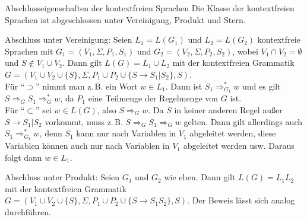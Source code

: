 \begin{Satz}{Abschlusseigenschaften der kontextfreien Sprachen}
    Die Klasse der kontextfreien Sprachen ist abgeschlossen unter
    Vereinigung, Produkt und Stern.
\end{Satz}

\begin{Beweis}
    Abschluss unter Vereinigung:
    Seien $L_1 = L(G_1)$ und $L_2 = L(G_2)$ kontextfreie Sprachen mit
    $G_1 = (V_1, \Sigma, P_1, S_1)$ und $G_2 = (V_2, \Sigma, P_2, S_2)$, wobei
    $V_1 \cap V_2 = \emptyset$ und $S \notin V_1 \cup V_2$.
    Dann gilt $L(G) = L_1 \cup L_2$ mit der kontextfreien Grammatik\\
    $G = (V_1 \cup V_2 \cup \{S\}, \Sigma,
    P_1 \cup P_2 \cup \{S \rightarrow S_1 | S_2\}, S)$.\\
    Für "`$\supset$"' nimmt man z.\,B. ein Wort $w \in L_1$.
    Dann ist $S_1 \Rightarrow_{G_1}^\ast w$ und es gilt
    $S \Rightarrow_G S_1 \Rightarrow_G^\ast w$, da $P_1$ eine Teilmenge der
    Regelmenge von $G$ ist.\\
    Für "`$\subset$"' sei $w \in L(G)$, also $S \Rightarrow_G w$.
    Da $S$ in keiner anderen Regel außer $S \rightarrow S_1 | S_2$ vorkommt,
    muss z.\,B. $S \Rightarrow_G S_1 \Rightarrow_G w$ gelten.
    Dann gilt allerdings auch $S_1 \Rightarrow_{G_1}^\ast w$, denn
    $S_1$ kann nur nach Variablen in $V_1$ abgeleitet werden,
    diese Variablen können auch nur nach Variablen in $V_1$ abgeleitet werden
    usw.
    Daraus folgt dann $w \in L_1$.

    Abschluss unter Produkt:
    Seien $G_1$ und $G_2$ wie eben.
    Dann gilt $L(G) = L_1 L_2$ mit der kontextfreien Grammatik
    $G = (V_1 \cup V_2 \cup \{S\}, \Sigma,
    P_1 \cup P_2 \cup \{S \rightarrow S_1 S_2\}, S)$.
    Der Beweis lässt sich analog durchführen.


\end{Beweis}
